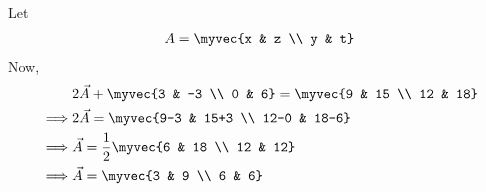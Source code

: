 Let
\begin{align}
    A=\myvec{x & z \\ y & t} \label{aug/2/10eq:A}
\end{align}
Now,
\begin{align}
    &2 \vec{A} +  \myvec{3 & -3 \\ 0 & 6} =  \myvec{9 & 15 \\ 12 & 18} \\
   \implies &2 \vec{A}  =  \myvec{9-3 & 15+3 \\ 12-0 & 18-6}\\
   \implies & \vec{A}  = \frac{1}{2} \myvec{6 & 18 \\ 12 & 12}\\
   \implies &\vec{A} = \myvec{3 & 9 \\ 6 & 6}   
\end{align}
